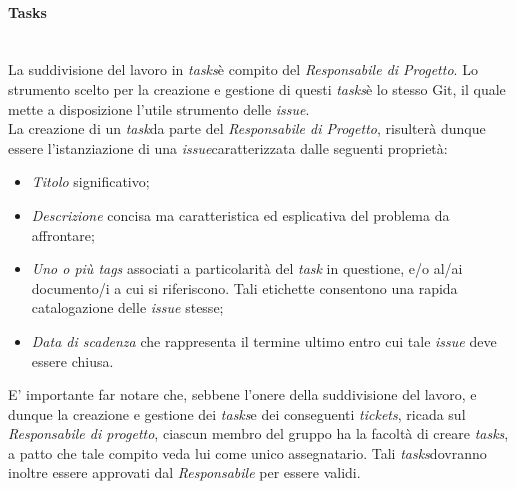 \paragraph{Tasks} ~\\
	La suddivisione del lavoro in \textit{tasks}\glossario è compito del \textit{Responsabile di Progetto}. Lo strumento scelto per la creazione e gestione di questi \textit{tasks}\glossario è lo stesso Git\glossario, il quale mette a disposizione l'utile strumento delle \textit{issue}\glossario.\\
	La creazione di un \textit{task}\glossario da parte del \textit{Responsabile di Progetto}, risulterà dunque essere l'istanziazione di una \textit{issue}\glossario caratterizzata dalle seguenti proprietà:
	\begin{itemize}
	\item \textit{Titolo} significativo;
	\item \textit{Descrizione} concisa ma caratteristica ed esplicativa del problema da affrontare;
	\item \textit{Uno o più tags} associati a particolarità del \textit{task} in questione, e/o al/ai documento/i a cui si riferiscono. Tali etichette consentono una rapida catalogazione delle \textit{issue} stesse;
	\item \textit{Data di scadenza} che rappresenta il termine ultimo entro cui tale \textit{issue} deve essere chiusa.
	\end{itemize}
	E' importante far notare che, sebbene l'onere della suddivisione del lavoro, e dunque la creazione e gestione dei \textit{tasks}\glossario e dei conseguenti \textit{tickets}\glossario, ricada sul \textit{Responsabile di progetto}, ciascun membro del gruppo ha la facoltà di creare \textit{tasks}\glossario, a patto che tale compito veda lui come unico assegnatario. Tali \textit{tasks}\glossario dovranno inoltre essere approvati dal \textit{Responsabile} per essere validi.

